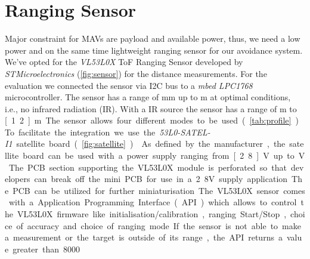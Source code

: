 \section{Ranging Sensor}
\label{sec:ranging sensor}
Major constraint for MAVs are payload and available power, thus, we need a low power and on the same time lightweight ranging sensor for our avoidance system. We've opted for the \textit{VL53L0X} ToF Ranging Sensor developed by \textit{STMicroelectronics} (\cref{fig:sensor}) for the distance measurements. For the evaluation we connected the sensor via I2C bus to a \textit{mbed LPC1768} microcontroller. The sensor has a range of \unit[0]{mm} up to \unit[2]{m} at optimal conditions, i.e., no infrared radiation (IR). With a IR source the sensor has a range of \unit[0]{m} to \unit[1.2]{m}.  The sensor allows four different modes to be used (\cref{tab:profile}). To facilitate the integration we use the \textit{53L0-SATEL-I1} satellite board (\cref{fig:satellite}) \cite{boardVL53L0X}. As defined by the manufacturer, the satellite board can be used with a power supply ranging from \unit[2.8]{V} up to \unit[5]{V}. The PCB section supporting the VL53L0X module is perforated so that developers can break off the mini PCB for use in a 2.8V supply application. The PCB can be utilized for further miniaturisation. The VL53L0X sensor comes with a Application Programming Interface (API) which allows to control the VL53L0X firmware like initialisation/calibration, ranging Start/Stop, choice of accuracy and choice of ranging mode. If the sensor is not able to make a measurement or the target is outside of its range, the API returns a value greater than 8000 \cite{VL53L0X}.\\
